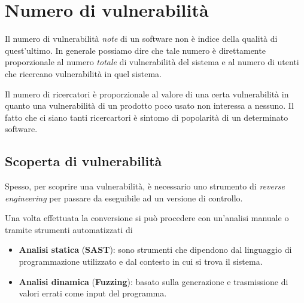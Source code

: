\section{Numero di vulnerabilità}
Il numero di vulnerabilità \emph{note} di un software non è indice della qualità di quest'ultimo. In generale possiamo
dire che tale numero è direttamente proporzionale al numero \emph{totale} di vulnerabilità del sistema e al numero di
utenti che ricercano vulnerabilità in quel sistema.

Il numero di ricercatori è proporzionale al valore di una certa vulnerabilità in quanto una vulnerabilità di un
prodotto poco usato non interessa a nessuno. Il fatto che ci siano tanti ricercartori è sintomo di popolarità di un
determinato software.

\subsection{Scoperta di vulnerabilità}
Spesso, per scoprire una vulnerabilità, è necessario uno strumento di \emph{reverse engineering} per passare da
eseguibile ad un versione di controllo.

Una volta effettuata la conversione si può procedere con un'analisi manuale o tramite strumenti automatizzati di
\begin{itemize}
	\item \textbf{Analisi statica} (\textbf{SAST}): sono strumenti che dipendono dal linguaggio di programmazione
	      utilizzato e dal contesto in cui si trova il sistema.
	\item \textbf{Analisi dinamica} (\textbf{Fuzzing}): basato sulla generazione e trasmissione di valori errati come
	      input del programma.
\end{itemize}

